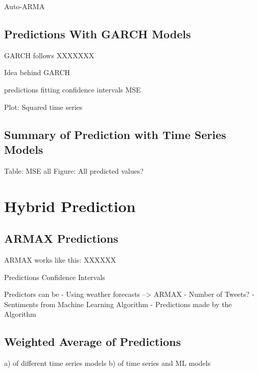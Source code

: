Auto-ARMA


\subsection{Predictions With GARCH Models}
GARCH follows 
XXXXXXX

Idea behind GARCH

predictions
fitting
confidence intervals
MSE

Plot: Squared time series



\subsection{Summary of Prediction with Time Series Models}
Table: MSE all
Figure: All predicted values?


\section{Hybrid Prediction}

\subsection{ARMAX Predictions}
ARMAX works like this: 
XXXXXX

Predictions
Confidence Intervals


Predictors can be 
- Using weather forecasts --> ARMAX
- Number of Tweets?
- Sentiments from Machine Learning Algorithm
- Predictions made by the Algorithm



\subsection{Weighted Average of Predictions}
a) of different time series models
b) of time series and ML models